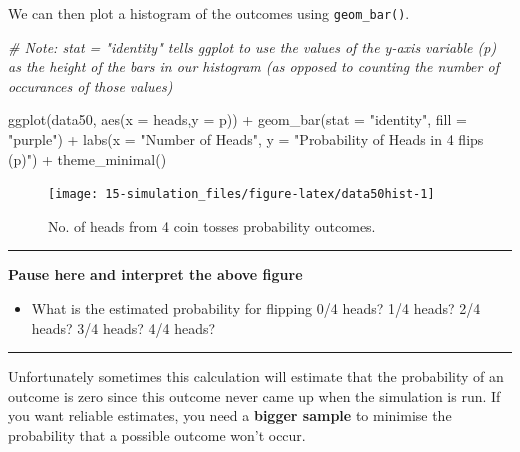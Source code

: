 \documentclass[
  oneside]{book}
\newenvironment{Shaded}{\begin{snugshade}}{\end{snugshade}}
\newcommand{\AttributeTok}[1]{\textcolor[rgb]{0.77,0.63,0.00}{#1}}
\newcommand{\CommentTok}[1]{\textcolor[rgb]{0.56,0.35,0.01}{\textit{#1}}}
\newcommand{\FunctionTok}[1]{\textcolor[rgb]{0.00,0.00,0.00}{#1}}
\newcommand{\NormalTok}[1]{#1}
\newcommand{\SpecialCharTok}[1]{\textcolor[rgb]{0.00,0.00,0.00}{#1}}
\newcommand{\StringTok}[1]{\textcolor[rgb]{0.31,0.60,0.02}{#1}}
\providecommand{\tightlist}{%
  \setlength{\itemsep}{0pt}\setlength{\parskip}{0pt}}
\begin{document}
We can then plot a histogram of the outcomes using \texttt{geom\_bar()}.

\begin{Shaded}
\begin{Highlighting}[]
\CommentTok{\# Note: stat = "identity" tells  ggplot to use the values of the y{-}axis variable (p) as the height of the bars in our histogram (as opposed to counting the number of occurances of those values)}

\FunctionTok{ggplot}\NormalTok{(data50, }\FunctionTok{aes}\NormalTok{(}\AttributeTok{x =}\NormalTok{ heads,}\AttributeTok{y =}\NormalTok{ p)) }\SpecialCharTok{+} 
  \FunctionTok{geom\_bar}\NormalTok{(}\AttributeTok{stat =} \StringTok{"identity"}\NormalTok{, }\AttributeTok{fill =} \StringTok{"purple"}\NormalTok{) }\SpecialCharTok{+} 
  \FunctionTok{labs}\NormalTok{(}\AttributeTok{x =} \StringTok{"Number of Heads"}\NormalTok{, }\AttributeTok{y =} \StringTok{"Probability of Heads in 4 flips (p)"}\NormalTok{) }\SpecialCharTok{+}
  \FunctionTok{theme\_minimal}\NormalTok{()}
\end{Highlighting}
\end{Shaded}

\begin{figure}

{\centering \texttt{[image: 15-simulation\_files/figure-latex/data50hist-1]} 

}

\caption{No. of heads from 4 coin tosses probability outcomes.}\label{fig:data50hist}
\end{figure}

\begin{center}\rule{0.5\linewidth}{0.5pt}\end{center}

\textbf{Pause here and interpret the above figure}

\begin{itemize}
\tightlist
\item
  What is the estimated probability for flipping 0/4 heads? 1/4 heads? 2/4 heads? 3/4 heads? 4/4 heads?
\end{itemize}

\begin{center}\rule{0.5\linewidth}{0.5pt}\end{center}

Unfortunately sometimes this calculation will estimate that the probability of an outcome is zero since this outcome never came up when the simulation is run. If you want reliable estimates, you need a \textbf{bigger sample} to minimise the probability that a possible outcome won't occur.
\end{document}
